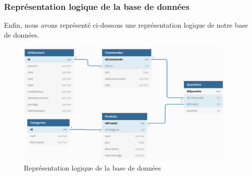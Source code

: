 \clearpage

\subsubsection{Représentation logique de la base de données}
Enfin, nous avons représenté ci-dessous une représentation logique de notre base de données.
\begin{figure}[H]
\begin{centering}
\includegraphics[width=0.95\textwidth,height=0.5\textheight]{Ressources/db-diagram-2.png}
\caption{Représentation logique de la base de données}
\par
\end{centering}
\end{figure}
